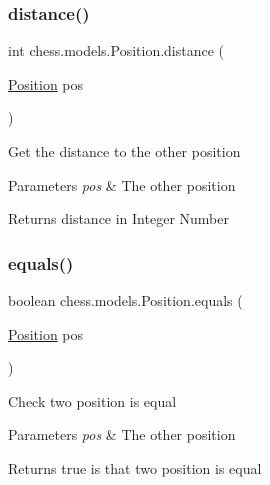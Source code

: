 \subsubsection{\texorpdfstring{distance()}{distance()}}
{\footnotesize\ttfamily int chess.\+models.\+Position.\+distance (\begin{DoxyParamCaption}\item[{\mbox{\hyperlink{classchess_1_1models_1_1_position}{Position}}}]{pos }\end{DoxyParamCaption})}

Get the distance to the other position


\begin{DoxyParams}{Parameters}
{\em pos} & The other position \\
\hline
\end{DoxyParams}
\begin{DoxyReturn}{Returns}
distance in Integer Number 
\end{DoxyReturn}
\mbox{\label{classchess_1_1models_1_1_position_ab66e53b6cb98e557aa0fc811e7987486}} 
\subsubsection{\texorpdfstring{equals()}{equals()}}
{\footnotesize\ttfamily boolean chess.\+models.\+Position.\+equals (\begin{DoxyParamCaption}\item[{\mbox{\hyperlink{classchess_1_1models_1_1_position}{Position}}}]{pos }\end{DoxyParamCaption})}

Check two position is equal


\begin{DoxyParams}{Parameters}
{\em pos} & The other position \\
\hline
\end{DoxyParams}
\begin{DoxyReturn}{Returns}
true is that two position is equal 
\end{DoxyReturn}
\mbox{\label{classchess_1_1models_1_1_position_a1de14ed4ac5e2376caf3ecbf4f415e38}} 
